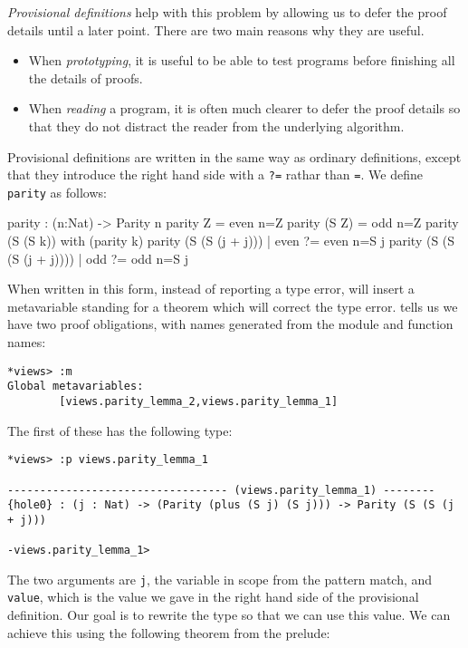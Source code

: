 \emph{Provisional definitions} help with this problem by allowing us to defer the proof details until a later point.
There are two main reasons why they are useful.

\begin{itemize}
\item When \emph{prototyping}, it is useful to be able to test programs before finishing all the details of proofs.  
\item When \emph{reading} a program, it is often much clearer to defer the proof details so that they do not distract the reader from the underlying algorithm.
\end{itemize}

\noindent
Provisional definitions are written in the same way as ordinary definitions, except that they introduce the right hand side with a \texttt{?=} rathar than \texttt{=}.
We define \texttt{parity} as follows:

\begin{code}
parity : (n:Nat) -> Parity n
parity Z     = even {n=Z}
parity (S Z) = odd {n=Z}
parity (S (S k)) with (parity k)
  parity (S (S (j + j)))     | even ?= even {n=S j}
  parity (S (S (S (j + j)))) | odd  ?= odd {n=S j}
\end{code}

\noindent
When written in this form, instead of reporting a type error, \Idris{} will insert a metavariable standing for a theorem which will correct the type error.
\Idris{} tells us we have two proof obligations, with names generated from the module and function names:

\begin{lstlisting}
*views> :m 
Global metavariables:
        [views.parity_lemma_2,views.parity_lemma_1]
\end{lstlisting}

\noindent
The first of these has the following type:

\begin{lstlisting}
*views> :p views.parity_lemma_1 

---------------------------------- (views.parity_lemma_1) --------
{hole0} : (j : Nat) -> (Parity (plus (S j) (S j))) -> Parity (S (S (j + j)))

-views.parity_lemma_1>  
\end{lstlisting}

\noindent
The two arguments are \texttt{j}, the variable in scope from the pattern match, and \texttt{value}, which is the value we gave in the right hand side of the provisional definition.
Our goal is to rewrite the type so that we can use this value.
We can achieve this using the following theorem from the prelude:


